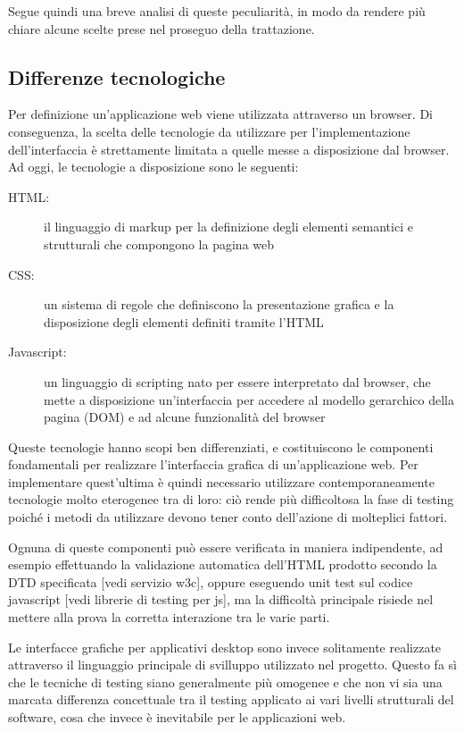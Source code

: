 \documentclass[12pt]{toptesi}
\begin{document}
Segue quindi una breve analisi di queste peculiarità, in modo da rendere più chiare alcune scelte prese nel proseguo della trattazione.

\subsection{Differenze tecnologiche}

Per definizione un'applicazione web viene utilizzata attraverso un browser. Di conseguenza, la scelta delle tecnologie da utilizzare per l'implementazione dell'interfaccia è strettamente limitata a quelle messe a disposizione dal browser. 
Ad oggi, le tecnologie a disposizione sono le seguenti:

\begin{description}
\item[HTML:] il linguaggio di markup per la definizione degli elementi semantici e strutturali che compongono la pagina web
\item[CSS:] un sistema di regole che definiscono la presentazione grafica e la disposizione degli elementi definiti tramite l'HTML
\item[Javascript:]  un linguaggio di scripting nato per essere interpretato dal browser, che mette a disposizione un'interfaccia per accedere al modello gerarchico della pagina (DOM) e ad alcune funzionalità del browser
\end{description}


Queste tecnologie hanno scopi ben differenziati, e costituiscono le componenti fondamentali per realizzare l'interfaccia grafica di un'applicazione web. Per implementare quest'ultima è quindi necessario utilizzare contemporaneamente tecnologie molto eterogenee tra di loro: ciò rende più difficoltosa la fase di testing poiché i metodi da utilizzare devono tener conto dell'azione di molteplici fattori. 

Ognuna di queste componenti può essere verificata in maniera indipendente, ad esempio effettuando la validazione automatica dell'HTML prodotto secondo la DTD specificata [vedi servizio w3c], oppure eseguendo unit test sul codice javascript [vedi librerie di testing per js], ma la difficoltà principale risiede nel mettere alla prova la corretta interazione tra le varie parti. 

Le interfacce grafiche per applicativi desktop sono invece solitamente realizzate attraverso il linguaggio principale di svilluppo utilizzato nel progetto. Questo fa sì che le tecniche di testing siano generalmente più omogenee e che non vi sia una marcata differenza concettuale tra il testing applicato ai vari livelli strutturali del software, cosa che invece è inevitabile per le applicazioni web.
\end{document}
